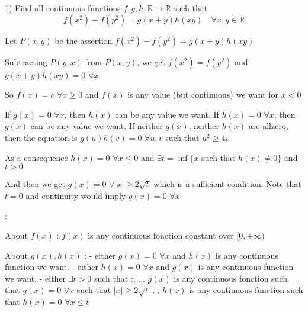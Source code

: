 \begin{solution}
	\begin{tcolorbox}1) Find all continuous functions $f,g,h:\mathbb{R}\to\mathbb{R}$ such that
\[f(x^2)-f(y^2)=g(x+y)h(xy) \quad \forall x,y\in\mathbb{R}\]\end{tcolorbox}
Let $P(x,y)$ be the assertion $f(x^2)-f(y^2)=g(x+y)h(xy)$

Subtracting $P(y,x)$ from $P(x,y)$, we get $f(x^2)=f(y^2)$ and $g(x+y)h(xy)=0$ $\forall x$

So $f(x)=c$ $\forall x\ge 0$ and $f(x)$ is any value (but continuous) we want for $x<0$

If $g(x)=0$ $\forall x$, then $h(x)$ can be any value we want.
If $h(x)=0$ $\forall x$, then $g(x)$ can be any value we want.
If neither $g(x)$, neither $h(x)$ are allzero, then the equation is $g(u)h(v)=0$ $\forall u,v$ such that $u^2\ge 4v$

As a consequence $h(x)=0$ $\forall x\le 0$ and $\exists t=\inf\{x$ such that $h(x)\ne 0\}$ and $t>0$

And then we get $g(x)=0$ $\forall |x|\ge 2\sqrt t$ which is a sufficient condition.
Note that $t=0$ and continuity would imply $g(x)=0$ $\forall x$

 :

About $f(x)$ : $f(x)$ is any continuous fonction constant over $[0,+\infty)$

About $g(x),h(x)$ :
- either $g(x)=0$ $\forall x$ and $h(x)$ is any continuous function we want.
- either $h(x)=0$ $\forall x$ and $g(x)$ is any continuous function we want.
- either $\exists t>0$ such that :;
... $g(x)$ is any continuous fonction such that $g(x)=0$ $\forall x$ such that $|x|\ge 2\sqrt t$
... $h(x)$ is any continuous function such that $h(x)=0$ $\forall x\le t$
\end{solution}



